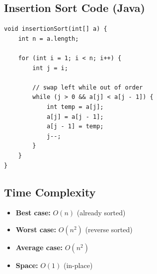 





\subsection{Insertion Sort Code (Java)}
\begin{verbatim}
void insertionSort(int[] a) {
    int n = a.length;

    for (int i = 1; i < n; i++) {
        int j = i;

        // swap left while out of order
        while (j > 0 && a[j] < a[j - 1]) {
            int temp = a[j];
            a[j] = a[j - 1];
            a[j - 1] = temp;
            j--;
        }
    }
}
\end{verbatim}

\subsection{Time Complexity}
\begin{itemize}
  \item \textbf{Best case:} $O(n)$ (already sorted)
  \item \textbf{Worst case:} $O(n^2)$ (reverse sorted)
  \item \textbf{Average case:} $O(n^2)$
  \item \textbf{Space:} $O(1)$ (in-place)
\end{itemize}